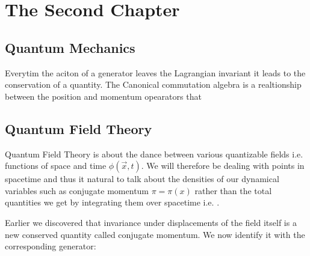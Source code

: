 \chapter{The Second Chapter}
\section{Quantum Mechanics}
Everytim the aciton of a generator leaves the Lagrangian invariant it leads to the conservation of a quantity. The Canonical commutation algebra is a realtionship between the position and momentum opearators that

\section{Quantum Field Theory}
Quantum Field Theory is about the dance between various quantizable fields i.e. functions of space and time $\phi (\vec{x},t)$. We will therefore be dealing with points in spacetime and thus it natural to talk about the densities of our dynamical variables such as conjugate momentum $\pi = \pi (x)$ rather than the total quantities we get by integrating them over spacetime i.e. $$.

Earlier we discovered that invariance under displacements of the field itself is a new conserved quantity called conjugate momentum. We now identify it with the corresponding generator:
